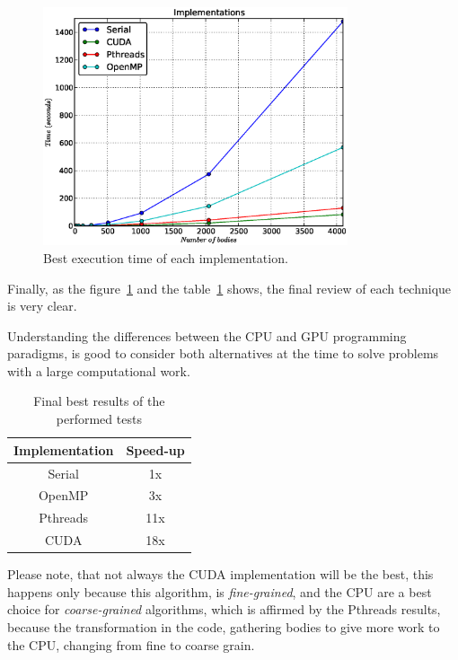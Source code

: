 \begin{figure}[h!t]
    \centering
    \includegraphics[width=0.8\textwidth]{images/all.eps}
    \caption{Best execution time of each implementation.}
    \label{fig:all}
\end{figure}

Finally, as the figure~\ref{fig:all} and the table~\ref{tab:all} shows,
the final review of each technique is very clear.

Understanding the differences between the CPU and GPU
programming paradigms, is good to consider both alternatives
at the time to solve problems with a large computational work.

\begin{table}[h!t]
    \centering
    \begin{tabular}{|c|c|}
        \hline
        \textbf{Implementation} & \textbf{Speed-up} \\\hline
        Serial  & 1x  \\\hline
        OpenMP  & 3x  \\\hline
        Pthreads & 11x \\\hline
        CUDA    & 18x \\\hline
    \end{tabular}
    \label{tab:all}
    \caption{Final best results of the performed tests}
\end{table}

Please note, that not always the CUDA implementation
will be the best, this happens only because this algorithm,
is \emph{fine-grained}, and the CPU are a best choice for
\emph{coarse-grained} algorithms, which is affirmed
by the Pthreads results, because the transformation
in the code, gathering bodies to give more work to the CPU,
changing from fine to coarse grain.
